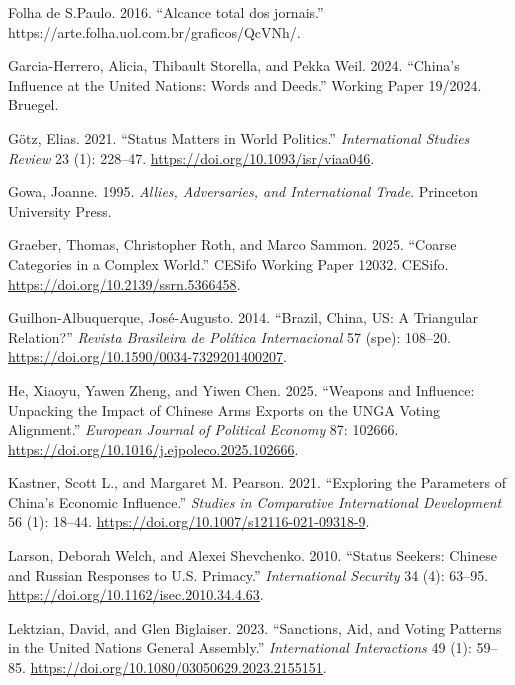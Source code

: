 \documentclass[
  12pt,
]{article}
\newlength{\cslhangindent}
\newenvironment{CSLReferences}[2] %
 {\begin{list}{}{%
  \setlength{\itemindent}{0pt}
  \setlength{\leftmargin}{0pt}
  \setlength{\parsep}{0pt}
  \ifodd #1
   \setlength{\leftmargin}{\cslhangindent}
   \setlength{\itemindent}{-1\cslhangindent}
  \fi
  \setlength{\itemsep}{#2\baselineskip}}}
 {\end{list}}
\begin{document}
\begin{CSLReferences}{1}{0}
Folha de S.Paulo. 2016. {``{Alcance total dos jornais}.''} https://arte.folha.uol.com.br/graficos/QcVNh/.

Garcia-Herrero, Alicia, Thibault Storella, and Pekka Weil. 2024. {``China's Influence at the {United Nations}: Words and Deeds.''} Working Paper 19/2024. Bruegel.

Götz, Elias. 2021. {``Status {Matters} in {World Politics}.''} \emph{International Studies Review} 23 (1): 228--47. \url{https://doi.org/10.1093/isr/viaa046}.

Gowa, Joanne. 1995. \emph{Allies, Adversaries, and International Trade}. Princeton University Press.

Graeber, Thomas, Christopher Roth, and Marco Sammon. 2025. {``Coarse Categories in a Complex World.''} CESifo Working Paper 12032. {CESifo}. \url{https://doi.org/10.2139/ssrn.5366458}.

Guilhon-Albuquerque, José-Augusto. 2014. {``Brazil, {China}, {US}: A Triangular Relation?''} \emph{Revista Brasileira de Pol{í}tica Internacional} 57 (spe): 108--20. \url{https://doi.org/10.1590/0034-7329201400207}.

He, Xiaoyu, Yawen Zheng, and Yiwen Chen. 2025. {``Weapons and Influence: {Unpacking} the Impact of {Chinese} Arms Exports on the {UNGA} Voting Alignment.''} \emph{European Journal of Political Economy} 87: 102666. \url{https://doi.org/10.1016/j.ejpoleco.2025.102666}.

Kastner, Scott L., and Margaret M. Pearson. 2021. {``Exploring the {Parameters} of {China}'s {Economic Influence}.''} \emph{Studies in Comparative International Development} 56 (1): 18--44. \url{https://doi.org/10.1007/s12116-021-09318-9}.

Larson, Deborah Welch, and Alexei Shevchenko. 2010. {``Status Seekers: Chinese and Russian Responses to {U.S.} Primacy.''} \emph{International Security} 34 (4): 63--95. \url{https://doi.org/10.1162/isec.2010.34.4.63}.

Lektzian, David, and Glen Biglaiser. 2023. {``Sanctions, Aid, and Voting Patterns in the {United Nations General Assembly}.''} \emph{International Interactions} 49 (1): 59--85. \url{https://doi.org/10.1080/03050629.2023.2155151}.


\end{CSLReferences}
\end{document}
